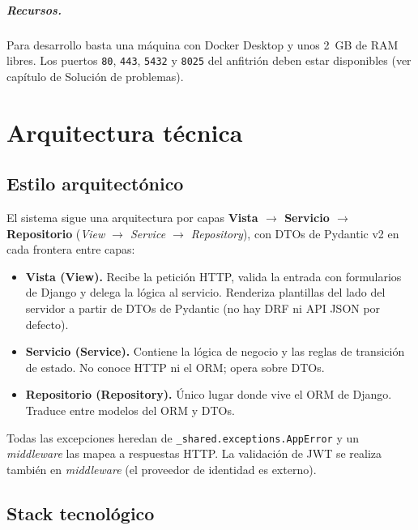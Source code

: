 \documentclass[12pt,letterpaper]{report}
\begin{document}
\paragraph{Recursos.} Para desarrollo basta una máquina con Docker Desktop y unos
2~GB de RAM libres. Los puertos \texttt{80}, \texttt{443}, \texttt{5432} y
\texttt{8025} del anfitrión deben estar disponibles (ver capítulo de Solución de
problemas).

\chapter{Arquitectura técnica}

\section{Estilo arquitectónico}

El sistema sigue una arquitectura por capas \textbf{Vista $\rightarrow$ Servicio
$\rightarrow$ Repositorio} (\emph{View $\rightarrow$ Service $\rightarrow$
Repository}), con DTOs de Pydantic v2 en cada frontera entre capas:

\begin{itemize}[leftmargin=1.4em]
  \item \textbf{Vista (View).} Recibe la petición HTTP, valida la entrada con
        formularios de Django y delega la lógica al servicio. Renderiza plantillas
        del lado del servidor a partir de DTOs de Pydantic (no hay DRF ni API JSON
        por defecto).
  \item \textbf{Servicio (Service).} Contiene la lógica de negocio y las reglas de
        transición de estado. No conoce HTTP ni el ORM; opera sobre DTOs.
  \item \textbf{Repositorio (Repository).} Único lugar donde vive el ORM de
        Django. Traduce entre modelos del ORM y DTOs.
\end{itemize}

Todas las excepciones heredan de \texttt{\_shared.exceptions.AppError} y un
\emph{middleware} las mapea a respuestas HTTP. La validación de JWT se realiza
también en \emph{middleware} (el proveedor de identidad es externo).

\section{Stack tecnológico}
\end{document}
